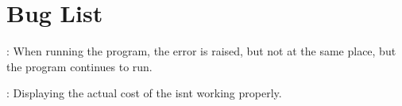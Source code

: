 \chapter{Bug List}
\hypertarget{bug}{}\label{bug}

\begin{DoxyRefList}
\item[Member \doxylink{class_player_a91f6319a7b7b9180697167c57c5ffdf4}{Player\+::activate\+Pokemon\+Card} (size\+\_\+t card\+Index)]\label{bug__bug000001}%
%
\+: When running the program, the error is raised, but not at the same place, but the program continues to run.  
\item[Member \doxylink{class_pokemon_card_a8a32ee4acd511eadab90f1c0dd94bac5}{Pokemon\+Card\+::display\+Info} () const override]\label{bug__bug000002}%
%
\+: Displaying the actual cost of the  isn\textquotesingle{}t working properly. 
\end{DoxyRefList}